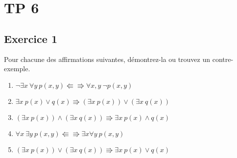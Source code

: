 \section{TP 6}

\subsection*{Exercice 1}
Pour chacune des affirmations suivantes, démontrez-la ou trouvez un contre-exemple.
\begin{enumerate}
	\item $\neg \exists x \ \forall y \ p(x, y) \Lleftarrow\!\!\!\!\Rrightarrow \forall x, y \ \neg p(x, y)$
	\item $\exists x \ p(x) \vee q(x) \Rrightarrow (\exists x \ p(x)) \vee (\exists x \ q(x))$
	\item $(\exists x \ p(x)) \wedge (\exists x \ q(x)) \Rrightarrow \exists x \ p(x) \wedge q(x)$
	\item $\forall x \ \exists y \ p(x, y) \Lleftarrow\!\!\!\!\Rrightarrow \exists x \forall y \ p(x, y)$
	\item $(\exists x \ p(x)) \vee (\exists x \ q(x)) \Rrightarrow \exists x \ p(x) \vee q(x)$
\end{enumerate}

